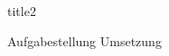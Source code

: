 \documentclass[12pt]{article}
\begin{document}
{title2}

\frontmatter

\tableofcontents

\mainmatter
    {Aufgabestellung}
    \newpage
    {Umsetzung}
\end{document}
